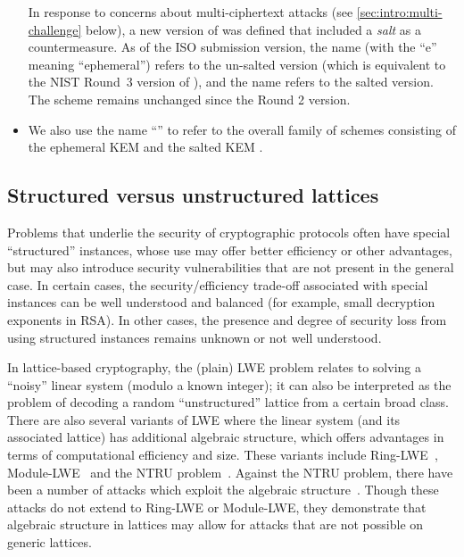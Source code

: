 \begin{itemize}
  In response to concerns about multi-ciphertext attacks (see \autoref{sec:intro:multi-challenge} below), a new version of \FrodoKEM was defined that included a \emph{salt} as a countermeasure.
  As of the ISO submission version, the name \eFrodoKEM (with the ``e'' meaning ``ephemeral'') refers to the un-salted version (which is equivalent to the NIST Round~3 version of \FrodoKEM), and the name \FrodoKEM refers to the salted version.
  The \FrodoPKE scheme remains unchanged since the Round 2 version.
\item We also use the name ``\FrodoKEM'' to refer to the overall family of schemes consisting of the ephemeral KEM \eFrodoKEM and the salted KEM \FrodoKEM.
\end{itemize}

\subsection{Structured versus unstructured lattices}

Problems that underlie the security of cryptographic protocols often have special ``structured'' instances, whose use may offer better efficiency or other advantages, but may also introduce security vulnerabilities that are not present in the general case.
In certain cases, the security/efficiency trade-off associated with special instances can be well understood and balanced
(for example, small decryption exponents in RSA).
In other cases, the presence and degree of security loss from using structured instances remains unknown or not well understood.

In lattice-based cryptography, the (plain) LWE problem relates to solving a “noisy” linear system (modulo a known integer); it can also be interpreted as the problem of decoding a random “unstructured” lattice from a certain broad class.
There are also several variants of LWE where the linear system (and its associated lattice) has additional algebraic structure, which offers advantages in terms of computational efficiency and size.
These variants include Ring-LWE~\cite{DBLP:journals/jacm/LyubashevskyPR13}, Module-LWE~\cite{ITCS:BraGenVai12,DBLP:journals/dcc/LangloisS15} and the NTRU problem~\cite{HofPipSil98}.
Against the NTRU problem, there have been a number of attacks which exploit the algebraic structure~\cite{Soliloquy, EfficientClass}.
Though these attacks do not extend to Ring-LWE or Module-LWE, they demonstrate that algebraic structure in lattices may allow for attacks that are not possible on generic lattices.

